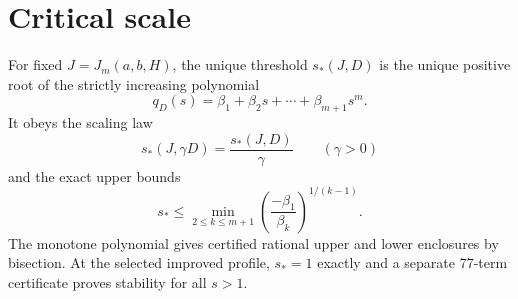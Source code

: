 \section*{Critical scale}
For fixed $J=J_m(a,b,H)$, the unique threshold $s_*(J,D)$ is the unique
positive root of the strictly
increasing polynomial
\[
q_D(s)=\beta_1+\beta_2s+\cdots+\beta_{m+1}s^m.
\]
It obeys the scaling law
\[
s_*(J,\gamma D)=\frac{s_*(J,D)}{\gamma}\qquad(\gamma>0)
\]
and the exact upper bounds
\[
s_*\le \min_{2\le k\le m+1}
\left(\frac{-\beta_1}{\beta_k}\right)^{1/(k-1)}.
\]
The monotone polynomial gives certified rational upper and lower enclosures by
bisection.  At the selected improved profile, $s_*=1$ exactly and a separate
77-term certificate proves stability for all $s>1$.
